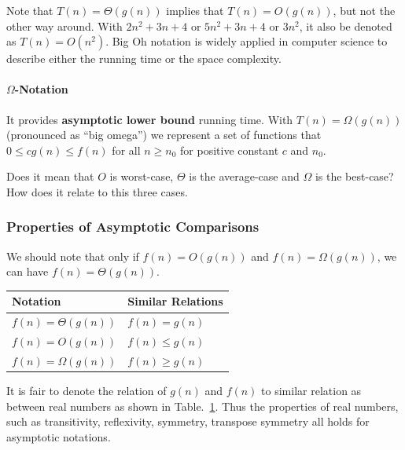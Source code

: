 \documentclass[../main.tex]{subfiles}
\begin{document}
Note that $T(n) = \Theta(g(n))$ implies that $T(n)=O(g(n))$, but not the other way around. With $2n^2+3n+4$ or $5n^2+3n+4$ or $3n^2$, it also be denoted as $T(n)=O(n^2)$. Big Oh notation is widely applied in computer science to describe either the running time or the space complexity.

\paragraph{$\Omega$-Notation} It provides \textbf{asymptotic lower bound} running time. With $T(n)=\Omega(g(n))$(pronounced as ``big omega'') we represent a set of functions that $0 \leq cg(n) \leq f(n)$ for all $n\geq n_0$ for positive constant $c$ and $n_0$. 


\begin{bclogo}[couleur = blue!30, arrondi=0.1,logo=\bccrayon,ombre=true]{Does it mean that $O$ is worst-case, $\Theta$ is the average-case and $\Omega$ is the best-case? How does it relate to this three cases. }
\end{bclogo}

\subsubsection{Properties of Asymptotic Comparisons}
We should note that only if $f(n)=O(g(n))$ and $f(n)=\Omega(g(n))$, we can have $f(n)=\Theta(g(n))$.

\begin{table}[!ht]
\begin{small}
\centering
\noindent{}
 \noindent \begin{tabular}{|p{}|p{}| }
  \hline
 Notation & Similar Relations   \\ \hline
$f(n)=\Theta(g(n))$  & $f(n)=g(n)$ \\\hline
$f(n)=O(g(n))$  &$f(n)\leq g(n)$\\ \hline
$f(n)=\Omega(g(n))$  & $f(n)\geq g(n)$\\\hline
\end{tabular}
  \label{tab:asymptotic_notation_property}
  \end{small}
\end{table}

It is fair to denote the relation of $g(n)$ and $f(n)$ to similar relation as between real numbers as shown in Table.~\ref{tab:asymptotic_notation_property}. Thus the properties of real numbers, such as transitivity, reflexivity, symmetry, transpose symmetry all holds for asymptotic notations. 
\end{document}
